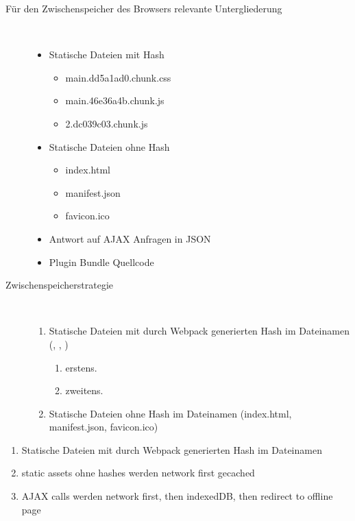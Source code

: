 \begin{description}
    \item[Für den Zwischenspeicher des Browsers relevante Untergliederung]~\par
    \begin{itemize}
       \item Statische Dateien mit Hash
       \begin{itemize}
            \item main.dd5a1ad0.chunk.css
            \item main.46e36a4b.chunk.js
            \item 2.dc039c03.chunk.js
       \end{itemize}
       \item Statische Dateien ohne Hash
       \begin{itemize}
            \item index.html
            \item manifest.json
            \item favicon.ico
       \end{itemize}
       \item Antwort auf AJAX Anfragen in JSON
       \item Plugin Bundle Quellcode
    \end{itemize}
    \item[Zwischenspeicherstrategie]~\par
    \begin{enumerate}
       \item Statische Dateien mit durch Webpack generierten Hash im Dateinamen (, , )
       \begin{enumerate}
          \item erstens.
          \item zweitens.
       \end{enumerate}
       \item Statische Dateien ohne Hash im Dateinamen (index.html, manifest.json, favicon.ico)
    \end{enumerate}
 \end{description}

\begin{enumerate}
    \item Statische Dateien mit durch Webpack generierten Hash im Dateinamen
    \item static assets ohne hashes werden network first gecached
    \item AJAX calls werden network first, then indexedDB, then redirect to offline page
\end{enumerate}

